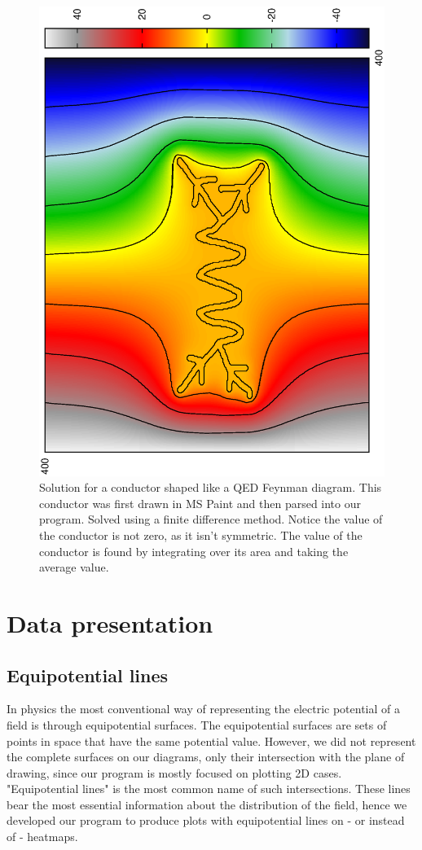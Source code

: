 \documentclass[aps,twocolumn,pre,nofootinbib,10pt]{revtex4-1}
\begin{document}
\begin{figure}[h]
\includegraphics*[height=\breite \columnwidth,angle=270]{feynman.ps} 
\caption{Solution for a conductor shaped like a QED Feynman diagram. This conductor was first drawn in MS Paint and then parsed into our program. Solved using a finite difference method. Notice the value of the conductor is not zero, as it isn't symmetric. The value of the conductor is found by integrating over its area and taking the average value.}
\end{figure}


\section{Data presentation}
\subsection{Equipotential lines}
In physics the most conventional way of representing the electric potential of a field is through equipotential surfaces. The equipotential surfaces are sets of points in space that have the same potential value. However, we did not represent the complete surfaces on our diagrams, only their intersection with the plane of drawing, since our program is mostly focused on plotting 2D cases. "Equipotential lines" is the most common name of such intersections. These lines bear the most essential information about the distribution of the field, hence we developed our program to produce plots with equipotential lines on - or instead of - heatmaps.
\end{document}
